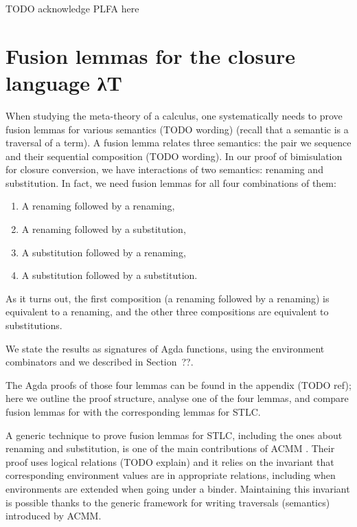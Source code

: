 \documentclass[bsc,frontabs,twoside,singlespacing,parskip,deptreport]{infthesis}
\theoremstyle{definition}
\begin{document}
TODO acknowledge PLFA here


\section{Fusion lemmas for the closure language λT}

When studying the meta-theory of a calculus, one systematically needs
to prove fusion lemmas for various semantics (TODO wording) (recall
that a semantic is a traversal of a term). A fusion
lemma relates three semantics: the pair we sequence and their
sequential composition (TODO wording). In our proof of bimisulation
for closure conversion, we have interactions of two semantics:
renaming and substitution. In fact, we need fusion lemmas for all four
combinations of them:

\begin{enumerate}
  \item A renaming followed by a renaming,
  \item A renaming followed by a substitution,
  \item A substitution followed by a renaming,
  \item A substitution followed by a substitution.
  \end{enumerate}

As it turns out, the first composition (a renaming followed by a
renaming) is equivalent to a renaming, and the other three compositions
are equivalent to substitutions. 

We state the results as signatures of Agda functions, using the
environment combinators \AS{\_<\$>\_} and  we described in Section~??.


The Agda proofs of those four lemmas can be found in the appendix
(TODO ref); here we outline the proof structure, analyse one of the
four lemmas, and compare
fusion lemmas for \lcl with the corresponding lemmas for STLC.

A generic technique to prove fusion lemmas for STLC,
including the ones about renaming and substitution, is one of the main
contributions of ACMM \cite{DBLP:conf/cpp/Allais0MM17}. Their proof
uses logical relations (TODO explain) and it relies on the invariant
that corresponding environment values are in appropriate relations,
including when environments are extended when going under a
binder. Maintaining this invariant is possible thanks to the generic
framework for writing traversals (semantics) introduced by ACMM.
\end{document}
